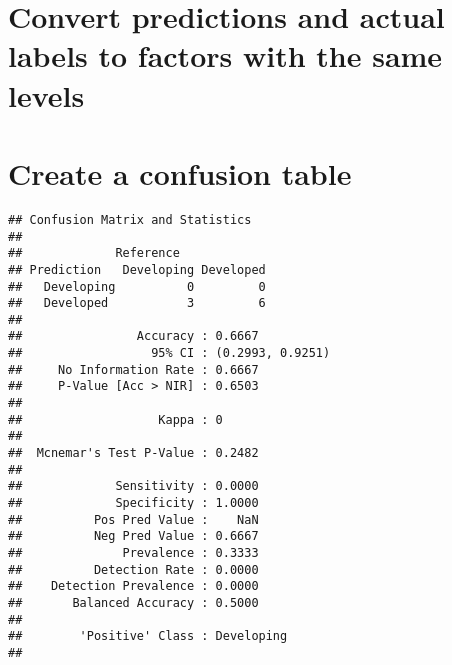 \documentclass[
]{article}
\newenvironment{Shaded}{\begin{snugshade}}{\end{snugshade}}
\newcommand{\AttributeTok}[1]{\textcolor[rgb]{0.13,0.29,0.53}{#1}}
\newcommand{\FunctionTok}[1]{\textcolor[rgb]{0.13,0.29,0.53}{\textbf{#1}}}
\newcommand{\NormalTok}[1]{#1}
\newcommand{\OtherTok}[1]{\textcolor[rgb]{0.56,0.35,0.01}{#1}}
\newcommand{\SpecialCharTok}[1]{\textcolor[rgb]{0.81,0.36,0.00}{\textbf{#1}}}
\newcommand{\StringTok}[1]{\textcolor[rgb]{0.31,0.60,0.02}{#1}}
\begin{document}
\section{Convert predictions and actual labels to factors with the same
levels}\label{convert-predictions-and-actual-labels-to-factors-with-the-same-levels}

\begin{Shaded}
\end{Shaded}

\section{Create a confusion table}\label{create-a-confusion-table}

\begin{Shaded}
\end{Shaded}

\begin{verbatim}
## Confusion Matrix and Statistics
## 
##             Reference
## Prediction   Developing Developed
##   Developing          0         0
##   Developed           3         6
##                                           
##                Accuracy : 0.6667          
##                  95% CI : (0.2993, 0.9251)
##     No Information Rate : 0.6667          
##     P-Value [Acc > NIR] : 0.6503          
##                                           
##                   Kappa : 0               
##                                           
##  Mcnemar's Test P-Value : 0.2482          
##                                           
##             Sensitivity : 0.0000          
##             Specificity : 1.0000          
##          Pos Pred Value :    NaN          
##          Neg Pred Value : 0.6667          
##              Prevalence : 0.3333          
##          Detection Rate : 0.0000          
##    Detection Prevalence : 0.0000          
##       Balanced Accuracy : 0.5000          
##                                           
##        'Positive' Class : Developing      
## 
\end{verbatim}
\end{document}
